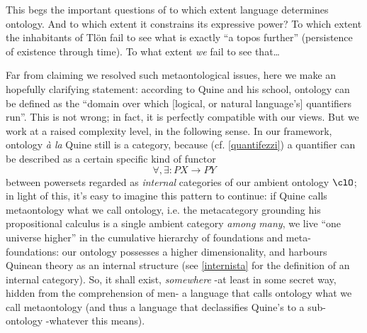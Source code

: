 This begs the important questions of to which extent language determines ontology. And to which extent it constrains its expressive power? To which extent the inhabitants of Tl\"on fail to see what is exactly ``a topos further'' (persistence of existence through time). To what extent \emph{we} fail to see that\dots



Far from claiming we resolved such metaontological issues, here we make an hopefully clarifying statement: according to Quine and his school, ontology can be defined as the ``domain over which [logical, or natural language's] quantifiers run''. This is not wrong; in fact, it is perfectly compatible with our views. But we work at a raised complexity level, in the following sense. In our framework, ontology \emph{à la} Quine still is a category, because (cf. \autoref{quantifezzi}) a quantifier can be described as a certain specific kind of functor
\[\forall,\exists : PX \to PY\]
between powersets regarded as \emph{internal} categories of our ambient ontology $\clO$; in light of this, it's easy to imagine this pattern to continue: if Quine calls metaontology what we call ontology, i.e. the metacategory grounding his propositional calculus is a single ambient category \emph{among many}, we live ``one universe higher'' in the cumulative hierarchy of foundations and meta-foundations: our ontology possesses a higher dimensionality, and harbours Quinean theory as an internal structure (see \autoref{internista} for the definition of an internal category). So, it shall exist, \emph{somewhere} -at least in some secret way, hidden from the comprehension of men- a language that calls ontology what we call metaontology (and thus a language that declassifies Quine's to a sub-ontology -whatever this means).

